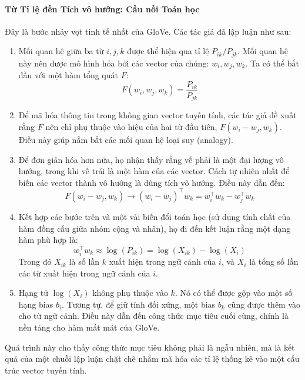 \paragraph{Từ Tỉ lệ đến Tích vô hướng: Cầu nối Toán học}
Đây là bước nhảy vọt tinh tế nhất của GloVe. Các tác giả đã lập luận như sau:
\begin{enumerate}
    \item Mối quan hệ giữa ba từ $i, j, k$ được thể hiện qua tỉ lệ $P_{ik}/P_{jk}$. Mối quan hệ này nên được mô hình hóa bởi các vector của chúng: $w_i, w_j, w_k$. Ta có thể bắt đầu với một hàm tổng quát $F$:
    \[ F(w_i, w_j, w_k) = \frac{P_{ik}}{P_{jk}} \]
    \item Để mã hóa thông tin trong không gian vector tuyến tính, các tác giả đề xuất rằng $F$ nên chỉ phụ thuộc vào hiệu của hai từ đầu tiên, $F(w_i - w_j, w_k)$. Điều này giúp nắm bắt các mối quan hệ loại suy (analogy).
    \item Để đơn giản hóa hơn nữa, họ nhận thấy rằng vế phải là một đại lượng vô hướng, trong khi vế trái là một hàm của các vector. Cách tự nhiên nhất để biến các vector thành vô hướng là dùng tích vô hướng. Điều này dẫn đến:
    \[ F(w_i - w_j, w_k) \rightarrow (w_i - w_j)^\top w_k = w_i^\top w_k - w_j^\top w_k \]
    \item Kết hợp các bước trên và một vài biến đổi toán học (sử dụng tính chất của hàm đồng cấu giữa nhóm cộng và nhân), họ đi đến kết luận rằng một dạng hàm phù hợp là:
    \[ w_i^\top w_k \approx \log(P_{ik}) = \log(X_{ik}) - \log(X_i) \]
    Trong đó $X_{ik}$ là số lần $k$ xuất hiện trong ngữ cảnh của $i$, và $X_i$ là tổng số lần các từ xuất hiện trong ngữ cảnh của $i$.
    \item Hạng tử $\log(X_i)$ không phụ thuộc vào $k$. Nó có thể được gộp vào một số hạng bias $b_i$. Tương tự, để giữ tính đối xứng, một bias $b_k$ cũng được thêm vào cho từ ngữ cảnh. Điều này dẫn đến công thức mục tiêu cuối cùng, chính là nền tảng cho hàm mất mát của GloVe.
\end{enumerate}
Quá trình này cho thấy công thức mục tiêu không phải là ngẫu nhiên, mà là kết quả của một chuỗi lập luận chặt chẽ nhằm mã hóa các tỉ lệ thống kê vào một cấu trúc vector tuyến tính.

